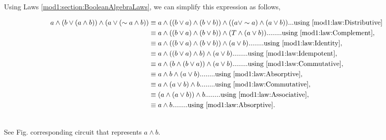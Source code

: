 \begin{subquestions}
\begin{subsubquestions}
		\subsubquestion
		
		Using Laws \ref{mod1:section:BooleanAlgebraLaws}, we can simplify this expression as follows,
		
		\begin{align}
			a \land (b \lor (a \land b)) \land (a \lor (\sim a \land b)) & \equiv a \land ((b \lor a) \land (b \lor b)) \land ((a \lor \sim a) \land (a \lor b))...\text{using \ref{mod1:law:Distributive}} \nonumber \\ 
			& \equiv a \land ((b \lor a) \land (b \lor b)) \land (T \land  (a \lor b))........\text{using \ref{mod1:law:Complement}},  \nonumber \\
			& \equiv a \land ((b \lor a) \land (b \lor b)) \land (a \lor b)........\text{using \ref{mod1:law:Identity}},  \nonumber \\
			& \equiv a \land ((b \lor a) \land b) \land (a \lor b)........\text{using \ref{mod1:law:Idempotent}},  \nonumber \\	
			& \equiv a \land (b \land (b \lor a)) \land (a \lor b)........\text{using \ref{mod1:law:Commutative}}, \nonumber \\ 
			& \equiv a \land b \land (a \lor b)........\text{using \ref{mod1:law:Absorptive}}, \nonumber \\
			& \equiv a \land (a \lor b) \land b........\text{using \ref{mod1:law:Commutative}}, \nonumber \\
			& \equiv (a \land (a \lor b)) \land b........\text{using \ref{mod1:law:Associative}}, \nonumber \\
			& \equiv a \land b........\text{using \ref{mod1:law:Absorptive}}. \\ \nonumber
		\end{align}
		
		See Fig. corresponding circuit that represents $a \land b$.
		
		
		
	\end{subsubquestions}
	
	
\end{subquestions}

